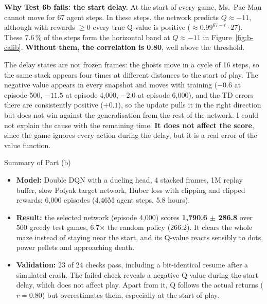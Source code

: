 \begin{notebox}
\textbf{Why Test 6b fails: the start delay.} At the start of every game, Ms.\ Pac-Man cannot move for 67 agent steps. In these steps, the network predicts $Q \approx -11$, although with rewards $\geq 0$ every true Q-value is positive ($\approx 0.99^{67-t} \cdot 27$). These 7.6\,\% of the steps form the horizontal band at $Q \approx -11$ in Figure~\ref{fig:b-calib}. \textbf{Without them, the correlation is 0.80}, well above the threshold.

\smallskip
The delay states are not frozen frames: the ghosts move in a cycle of 16 steps, so the same stack appears four times at different distances to the start of play. The negative value appears in every snapshot and moves with training ($-0.6$ at episode 500, $-11.5$ at episode 4,000, $-2.0$ at episode 6,000), and the TD errors there are consistently positive ($+0.1$), so the update pulls it in the right direction but does not win against the generalisation from the rest of the network. I could not explain the cause with the remaining time. \textbf{It does not affect the score}, since the game ignores every action during the delay, but it is a real error of the value function.
\end{notebox}

\FloatBarrier
\begin{summarybox}{Summary of Part (b)}
\begin{itemize}
  \item \textbf{Model:} Double DQN with a dueling head, 4 stacked frames, 1M replay buffer, slow Polyak target network, Huber loss with clipping and clipped rewards; 6,000 episodes (4.46M agent steps, 5.8 hours).
  \item \textbf{Result:} the selected network (episode 4,000) scores \textbf{1,790.6 $\pm$ 286.8} over 500 greedy test games, 6.7$\times$ the random policy (266.2). It clears the whole maze instead of staying near the start, and its Q-value reacts sensibly to dots, power pellets and approaching death.
  \item \textbf{Validation:} 23 of 24 checks pass, including a bit-identical resume after a simulated crash. The failed check reveals a negative Q-value during the start delay, which does not affect play. Apart from it, Q follows the actual returns ($r = 0.80$) but overestimates them, especially at the start of play.
\end{itemize}
\end{summarybox}
